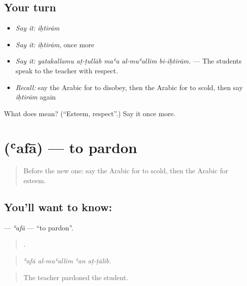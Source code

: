 \subsection*{Your turn}
\begin{itemize}
\raggedright
  \item \emph{Say it:} \emph{iḥtirām}
  \item \emph{Say it:} \emph{iḥtirām}, once more
  \item \emph{Say it:} \emph{yatakallamu aṭ-ṭullāb maʿa al-muʿallim bi-iḥtirām.} — The students speak to the teacher with respect.
  \item \emph{Recall:} say the Arabic for to disobey, then the Arabic for to scold, then say \emph{iḥtirām} again
\end{itemize}

\begin{tcolorbox}[breakable,colback=teal!4,colframe=teal!35!black,title={Before you move on}]
What does  mean? (\textquotedblleft{}Esteem, respect\textquotedblright{}.) Say it once more.
\end{tcolorbox}
\section[\texorpdfstring{\ar{عفا} (ʿafā)}{عفا (ʿafā)}]{ (ʿafā) — to pardon}

\label{lesson:AR-C534-afa}



\begin{quote}
Before the new one: say the Arabic for to scold, then the Arabic for esteem.
\end{quote}

\subsection*{You'll want to know: }
\textbf{} — \emph{ʿafā} — \textquotedblleft{}to pardon\textquotedblright{}.

\begin{quote}
   .
\end{quote}

\begin{quote}
\emph{ʿafā al-muʿallim ʿan aṭ-ṭālib.}
\end{quote}

\begin{quote}
The teacher pardoned the student.
\end{quote}

